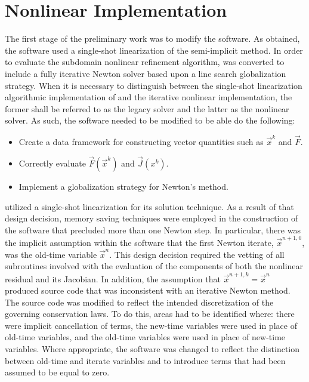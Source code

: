 \section{Nonlinear \cobra{} Implementation}
\label{sect:nln_solver:cobra}  
The first stage of the preliminary work was to modify the \cobra{} software.
As obtained, the \cobra{} software used a single-shot linearization  of the semi-implicit method.
In order to evaluate the subdomain nonlinear refinement algorithm, \cobra{} was converted to include a fully iterative Newton solver based upon a line search globalization strategy.
When it is necessary to distinguish between the single-shot linearization algorithmic implementation of \cobra{} and the iterative nonlinear \cobra{} implementation, the former shall be referred to as the legacy solver and the latter as the nonlinear solver.
As such, the \cobra{} software needed to be modified to be able do the following:

\begin{itemize}
\item{Create a data framework for constructing vector quantities such as $\vec{x}^{k}$ and $\vec{F}$.}
\item{Correctly evaluate $\vec{F}(\vec{x}^{k})$ and $\vec{J}(x^{k})$.}
\item{Implement a globalization strategy for Newton's method.}
\end{itemize}

\cobra{} utilized a single-shot linearization for its solution technique.
As a result of that design decision, memory saving techniques were employed in the construction of the software that precluded more than one Newton step.
In particular, there was the implicit assumption within the software that the first Newton iterate, $\vec{x}^{n+1, 0}$, was the old-time variable $\vec{x}^{n}$.
This design decision required the vetting of all subroutines involved with the evaluation of the components of both the nonlinear residual and its Jacobian.
In addition, the assumption that $\vec{x}^{n+1, k} = \vec{x}^{n}$ produced source code that was inconsistent with an iterative Newton method.
The source code was modified to reflect the intended discretization of the governing conservation laws.
To do this, areas had to be identified where: there were implicit cancellation of terms, the new-time variables were used in place of old-time variables, and the old-time variables were used in place of new-time variables.
Where appropriate, the software was changed to reflect the distinction between old-time and iterate variables and to introduce terms that had been assumed to be equal to zero.

